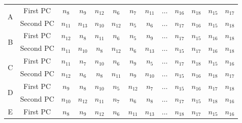 \begin{table}[!ht]
  \centering
  \begin{tabular}{|c|c|c|c|c|c|c|c|c|c|c|c|c|}
    \hline
    \multirow{2}{*}{A} & First PC & $n_{8}$ & $n_{9}$ & $n_{12}$ & $n_{6}$ & $n_{7}$ & $n_{11}$ & $\dots$ & \cellcolor{magenta} $ n_{16}$ & \cellcolor{orange} $n_{18}$ & \cellcolor{green} $n_{15}$ & \cellcolor{cyan} $n_{17}$ \\ \cline{2-13}
    & Second PC & $n_{11}$ & $n_{13}$ & $n_{10}$ & $n_{12}$ & $n_{5}$ & $n_{6}$ & $\dots$ & \cellcolor{cyan} $n_{17}$ & \cellcolor{magenta} $n_{16}$ & \cellcolor{green} $n_{15}$ & \cellcolor{orange} $n_{18}$ \\
    \hline
    \cline{1-13}
    \multirow{2}{*}{B}& First PC & $n_{12}$ & $n_{8}$ & $n_{11}$ & $n_{6}$ & $n_{5}$ & $n_{9}$ & $\dots$ &  \cellcolor{cyan} $n_{17}$ & \cellcolor{green} $n_{15}$ & \cellcolor{magenta} $n_{16}$ & \cellcolor{orange} $n_{18}$ \\ 
    \cline{2-13}
    & Second PC & $n_{11}$ & $n_{10}$ & $n_{8}$ & $n_{12}$ & $n_{6}$ & $n_{13}$ & $\dots$ &  \cellcolor{green} $n_{15}$ & \cellcolor{cyan} $n_{17}$ & \cellcolor{magenta}$n_{16}$ & \cellcolor{orange} $n_{18}$ \\ 
    \hline
    \cline{1-13}
    \multirow{2}{*}{C}& First PC & $n_{11}$ & $n_{7}$ & $n_{10}$ & $n_{6}$ & $n_{9}$ & $n_{5}$ & $\dots$ &  \cellcolor{cyan} $n_{17}$ & \cellcolor{orange} $n_{18}$ & \cellcolor{green}$n_{15}$ & \cellcolor{magenta} $n_{16}$ \\ 
    \cline{2-13}
    & Second PC & $n_{12}$ & $n_{6}$ & $n_{8}$ & $n_{11}$ & $n_{9}$ & $n_{10}$ & $\dots$ &  \cellcolor{green} $n_{15}$ & \cellcolor{magenta} $n_{16}$ & \cellcolor{orange}$n_{18}$ & \cellcolor{cyan} $n_{17}$ \\ 
    \hline
    \cline{1-13}
    \multirow{2}{*}{D}& First PC & $n_{9}$ & $n_{8}$ & $n_{10}$ & $n_{5}$ & $n_{12}$ & $n_{7}$ & $\dots$ &  \cellcolor{green} $n_{15}$ & \cellcolor{magenta} $n_{16}$ & \cellcolor{cyan} $n_{17}$ & \cellcolor{orange} $n_{18}$ \\ 
    \cline{2-13}
    & Second PC & $n_{10}$ & $n_{12}$ & $n_{11}$ & $n_{7}$ & $n_{6}$ & $n_{8}$ & $\dots$ &  \cellcolor{cyan} $n_{17}$ & \cellcolor{green} $n_{15}$ & \cellcolor{orange} $n_{18}$ & \cellcolor{magenta} $n_{16}$ \\ 
    \hline
    \cline{1-13}
    \multirow{2}{*}{E}& First PC & $n_{8}$ & $n_{9}$ & $n_{12}$ & $n_{6}$ & $n_{11}$ & $n_{13}$ & $\dots$ &  \cellcolor{orange} $n_{18}$ & \cellcolor{cyan} $n_{17}$ & \cellcolor{green}$n_{15}$ & \cellcolor{magenta} $n_{16}$ \\ 

\end{tabular}
\end{table}

